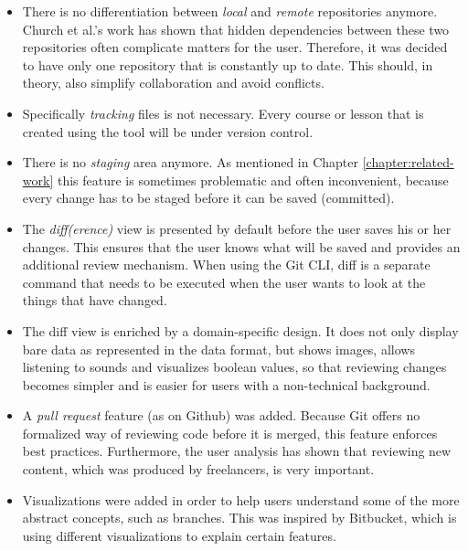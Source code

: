 \begin{itemize}
  \item There is no differentiation between \textit{local} and \textit{remote} repositories anymore. Church et al.'s \cite{church_case_2014} work has shown that hidden dependencies between these two repositories often complicate matters for the user. Therefore, it was decided to have only one repository that is constantly up to date. This should, in theory, also simplify collaboration and avoid conflicts.
  \item Specifically \emph{tracking} files is not necessary. Every course or lesson that is created using the tool will be under version control.
  \item There is no \emph{staging} area anymore. As mentioned in Chapter \ref{chapter:related-work} this feature is sometimes problematic and often inconvenient, because every change has to be staged before it can be saved (committed).
  \item The \emph{diff(erence)} view is presented by default before the user saves his or her changes. This ensures that the user knows what will be saved and provides an additional review mechanism. When using the Git CLI, diff is a separate command that needs to be executed when the user wants to look at the things that have changed.
  \item The diff view is enriched by a domain-specific design. It does not only display bare data as represented in the data format, but shows images, allows listening to sounds and visualizes boolean values, so that reviewing changes becomes simpler and is easier for users with a non-technical background.
  \item A \emph{pull request} feature (as on Github) was added. Because Git offers no formalized way of reviewing code before it is merged, this feature enforces best practices. Furthermore, the user analysis has shown that reviewing new content, which was produced by freelancers, is very important.
  \item Visualizations were added in order to help users understand some of the more abstract concepts, such as branches. This was inspired by Bitbucket, which is using different visualizations to explain certain features.
\end{itemize}

